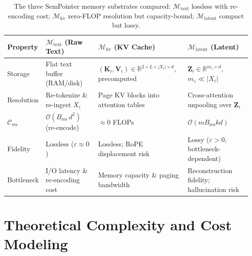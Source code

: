 \documentclass[runningheads]{llncs}
\begin{document}
{\begin{table}[t]
\centering
\renewcommand{\arraystretch}{0.95}
\setlength{\tabcolsep}{3pt}
{\footnotesize
\begin{tabular}{@{}lp{3.2cm}p{3.2cm}p{3.5cm}@{}}
\toprule
\textbf{Property}
  & \textbf{$\mathcal{M}_{\text{text}}$ (Raw Text)}
  & \textbf{$\mathcal{M}_{\text{kv}}$ (KV Cache)}
  & \textbf{$\mathcal{M}_{\text{latent}}$ (Latent)} \\
\midrule
Storage
  & Flat text buffer (RAM/disk)
  & $(\mathbf{K}_i,\mathbf{V}_i)\!\in\!\mathbb{R}^{2\times L\times|X_i|\times d}$, precomputed
  & $\mathbf{Z}_i\!\in\!\mathbb{R}^{m_z\times d}$, $m_z\!\ll\!|X_i|$ \\
Resolution
  & Re-tokenize \& re-ingest $X_i$
  & Page KV blocks into attention tables
  & Cross-attention unpooling over $\mathbf{Z}_i$ \\
$\mathcal{C}_{\mathrm{res}}$
  & $\mathcal{O}(B_{\mathrm{res}}\,d^2)$ (re-encode)
  & $\approx 0$ FLOPs
  & $\mathcal{O}(m B_{\mathrm{res}} k d)$ \\
Fidelity
  & Lossless ($\varepsilon\approx 0$)
  & Lossless; RoPE displacement risk
  & Lossy ($\varepsilon>0$, bottleneck-dependent) \\
Bottleneck
  & I/O latency \& re-encoding cost
  & Memory capacity \& paging bandwidth
  & Reconstruction fidelity; hallucination risk \\
\bottomrule
\end{tabular}
}
\caption{The three SemPointer memory substrates compared: $\mathcal{M}_{\text{text}}$ lossless with re-encoding cost; $\mathcal{M}_{\text{kv}}$ zero-FLOP resolution but capacity-bound; $\mathcal{M}_{\text{latent}}$ compact but lossy.}
\label{tab:substrates}
\end{table}

\enlargethispage{2\baselineskip}
\section{Theoretical Complexity and Cost Modeling}\label{sec:complexity}

}
\end{document}
